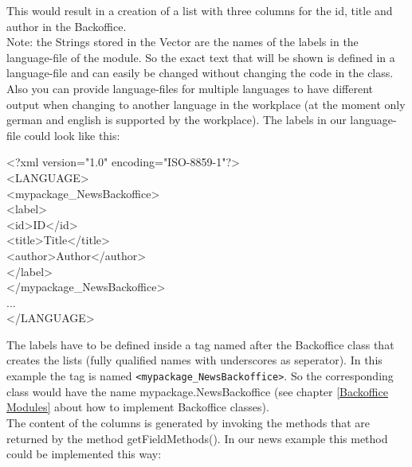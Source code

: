 This would result in a creation of a list with three columns for the id,
title and author in the Backoffice.\\
Note: the Strings stored in the Vector
are the names of the labels in the language-file of the module. So the exact
text that will be shown is defined in a language-file and can easily be 
changed without changing the code in the class. Also you can provide language-files
for multiple languages to have different output when changing to another language in
the workplace (at the moment only german and english is supported by the workplace).
The labels in our language-file could look like this:

\begin{xml}
<?xml version="1.0" encoding="ISO-8859-1"?>\\
<LANGUAGE>\\
\xtaba    <mypackage\_NewsBackoffice>\\   
\xtabb      <label>\\
\xtabc        <id>ID</id>\\
\xtabc        <title>Title</title>\\
\xtabc        <author>Author</author>\\
\xtabb      </label>\\
\xtaba    </mypackage\_NewsBackoffice>\\
\xtaba    ...\\
</LANGUAGE>\\   
\end{xml}

The labels have to be defined inside a tag named after the Backoffice class that
creates the lists (fully qualified names with underscores as seperator).
In this example the tag is named \texttt{<mypackage\_NewsBackoffice>}. So the corresponding
class would have the name {\class mypackage.NewsBackoffice} (see chapter \ref{Backoffice Modules} 
about how to implement Backoffice classes).\\
The content of the columns is generated by invoking the methods that are returned
by the method {\meth getFieldMethods()}. In our news example this method could be implemented
this way:

